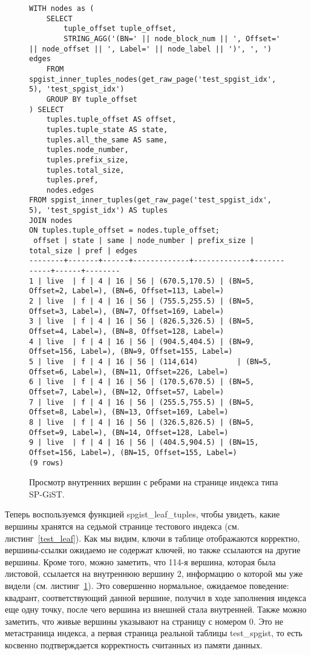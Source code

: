 \documentclass[12pt,oneside]{amsart}
\begin{document}
\begin{figure}[ht]
\begin{lstlisting}
WITH nodes as (
    SELECT
        tuple_offset tuple_offset,
        STRING_AGG('(BN=' || node_block_num || ', Offset=' || node_offset || ', Label=' || node_label || ')', ', ') edges
    FROM spgist_inner_tuples_nodes(get_raw_page('test_spgist_idx', 5), 'test_spgist_idx')
    GROUP BY tuple_offset
) SELECT
    tuples.tuple_offset AS offset,
    tuples.tuple_state AS state,
    tuples.all_the_same AS same,
    tuples.node_number,
    tuples.prefix_size,
    tuples.total_size,
    tuples.pref,
    nodes.edges
FROM spgist_inner_tuples(get_raw_page('test_spgist_idx', 5), 'test_spgist_idx') AS tuples
JOIN nodes
ON tuples.tuple_offset = nodes.tuple_offset;
 offset | state | same | node_number | prefix_size | total_size | pref | edges
--------+-------+------+-------------+-------------+------------+------+--------
1 | live  | f | 4 | 16 | 56 | (670.5,170.5) | (BN=5, Offset=2, Label=), (BN=6, Offset=113, Label=)
2 | live  | f | 4 | 16 | 56 | (755.5,255.5) | (BN=5, Offset=3, Label=), (BN=7, Offset=169, Label=)
3 | live  | f | 4 | 16 | 56 | (826.5,326.5) | (BN=5, Offset=4, Label=), (BN=8, Offset=128, Label=)
4 | live  | f | 4 | 16 | 56 | (904.5,404.5) | (BN=9, Offset=156, Label=), (BN=9, Offset=155, Label=)
5 | live  | f | 4 | 16 | 56 | (114,614)         | (BN=5, Offset=6, Label=), (BN=11, Offset=226, Label=)
6 | live  | f | 4 | 16 | 56 | (170.5,670.5) | (BN=5, Offset=7, Label=), (BN=12, Offset=57, Label=)
7 | live  | f | 4 | 16 | 56 | (255.5,755.5) | (BN=5, Offset=8, Label=), (BN=13, Offset=169, Label=)
8 | live  | f | 4 | 16 | 56 | (326.5,826.5) | (BN=5, Offset=9, Label=), (BN=14, Offset=128, Label=)
9 | live  | f | 4 | 16 | 56 | (404.5,904.5) | (BN=15, Offset=156, Label=), (BN=15, Offset=155, Label=)
(9 rows)
\end{lstlisting}
\caption{Просмотр внутренних вершин с ребрами на странице индекса типа SP-GiST.}\label{testInner}
\end{figure}

Теперь воспользуемся функцией spgist\_leaf\_tuples, чтобы увидеть, какие вершины хранятся на седьмой странице тестового индекса (см. листинг~\ref{test_leaf}). Как мы видим, ключи в таблице отображаются корректно, вершины-ссылки ожидаемо не содержат ключей, но также ссылаются на другие вершины. Кроме того, можно заметить, что 114-я вершина, которая была листовой, ссылается на внутреннюю вершину 2, информацию о которой мы уже видели (см. листинг~\ref{testInner}). Это совершенно нормальное, ожидаемое поведение: квадрант, соответствующий данной вершине, получил в ходе заполнения индекса еще одну точку, после чего вершина из внешней стала внутренней. Также можно заметить, что живые вершины указывают на страницу с номером 0. Это не метастраница индекса, а первая страница реальной таблицы test\_spgist, то есть косвенно подтверждается корректность считанных из памяти данных.
\end{document}
